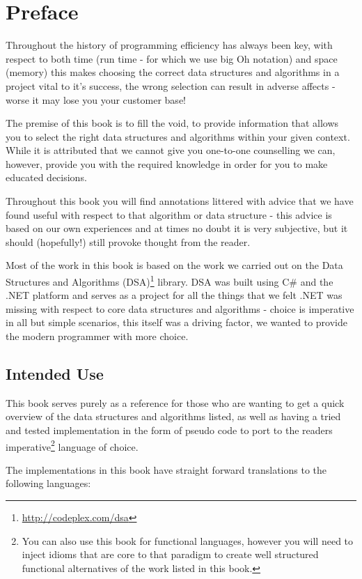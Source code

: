 \chapter*{Preface}
Throughout the history of programming efficiency has always been key, with respect to both time (run time - for which we use big Oh notation) and space (memory) this makes choosing the correct data structures and algorithms in a project vital to it's success, the wrong selection can result in adverse affects - worse it may lose you your customer base!

The premise of this book is to fill the void, to provide information that allows you to select the right data structures and algorithms within your given context. While it is attributed that we cannot give you one-to-one counselling we can, however, provide you with the required knowledge in order for you to make educated decisions.

Throughout this book you will find annotations littered with advice that we have found useful with respect to that algorithm or data structure - this advice is based on our own experiences and at times no doubt it is very subjective, but it should (hopefully!) still provoke thought from the reader.

Most of the work in this book is based on the work we carried out on the Data Structures and Algorithms (DSA)\footnote{\url{http://codeplex.com/dsa}} library. DSA was built using C\# and the .NET platform and serves as a project for all the things that we felt .NET was missing with respect to core data structures and algorithms - choice is imperative in all but simple scenarios, this itself was a driving factor, we wanted to provide the modern programmer with more choice.

\section*{Intended Use}
This book serves purely as a reference for those who are wanting to get a quick overview of the data structures and algorithms listed, as well as having a tried and tested implementation in the form of pseudo code to port to the readers imperative\footnote{You can also use this book for functional languages, however you will need to inject idioms that are core to that paradigm to create well structured functional alternatives of the work listed in this book.} language of choice.

The implementations in this book have straight forward translations to the following languages:

